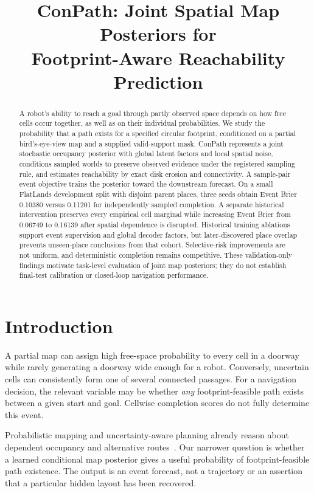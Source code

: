 \documentclass[conference,letterpaper,10pt]{IEEEtran}
\title{ConPath: Joint Spatial Map Posteriors for\\Footprint-Aware Reachability Prediction}
\author{\IEEEauthorblockN{Anonymous working draft}}
\begin{document}
\maketitle
\workingnote

\begin{abstract}
A robot's ability to reach a goal through partly observed space depends on how free cells occur together, as well as on their individual probabilities. We study the probability that a path exists for a specified circular footprint, conditioned on a partial bird's-eye-view map and a supplied valid-support mask. ConPath represents a joint stochastic occupancy posterior with global latent factors and local spatial noise, conditions sampled worlds to preserve observed evidence under the registered sampling rule, and estimates reachability by exact disk erosion and connectivity. A sample-pair event objective trains the posterior toward the downstream forecast. On a small FlatLands development split with disjoint parent places, three seeds obtain Event Brier 0.10380 versus 0.11201 for independently sampled completion. A separate historical intervention preserves every empirical cell marginal while increasing Event Brier from 0.06749 to 0.16139 after spatial dependence is disrupted. Historical training ablations support event supervision and global decoder factors, but later-discovered place overlap prevents unseen-place conclusions from that cohort. Selective-risk improvements are not uniform, and deterministic completion remains competitive. These validation-only findings motivate task-level evaluation of joint map posteriors; they do not establish final-test calibration or closed-loop navigation performance.
\end{abstract}

\section{Introduction}
A partial map can assign high free-space probability to every cell in a doorway while rarely generating a doorway wide enough for a robot. Conversely, uncertain cells can consistently form one of several connected passages. For a navigation decision, the relevant variable may be whether \emph{any} footprint-feasible path exists between a given start and goal. Cellwise completion scores do not fully determine this event.

Probabilistic mapping and uncertainty-aware planning already reason about dependent occupancy and alternative routes~\cite{shankar2020mrfmap,banfi2022uncertainty}. Our narrower question is whether a learned conditional map posterior gives a useful probability of footprint-feasible path existence. The output is an event forecast, not a trajectory or an assertion that a particular hidden layout has been recovered.
\end{document}
